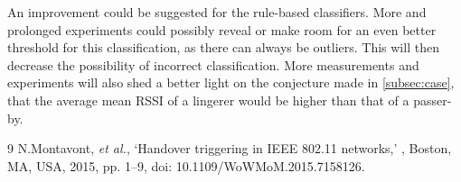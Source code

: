 \documentclass[twocolumn]{article}
\begin{document}
An improvement could be suggested for the rule-based classifiers. More and prolonged experiments could possibly reveal or make room for an even better threshold for this classification, as there can always be outliers. This will then decrease the possibility of incorrect classification. More measurements and experiments will also shed a better light on the conjecture made in \autoref{subsec:case}, that the average mean RSSI of a lingerer would be higher than that of a passer-by.

\begin{thebibliography}{9}
    N.Montavont, \textit{et al.}, `Handover triggering in IEEE 802.11 networks,' \textit{}, Boston, MA, USA, 2015, pp. 1--9, doi: 10.1109/WoWMoM.2015.7158126.

\end{thebibliography}
\end{document}
